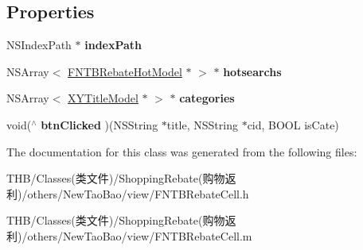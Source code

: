 \subsection*{Properties}
\begin{DoxyCompactItemize}
\item 
\mbox{\label{interface_f_n_t_b_rebate_cell_a0a51dda8573fe9d5c0b9a08085ca99f9}} 
N\+S\+Index\+Path $\ast$ {\bfseries index\+Path}
\item 
\mbox{\label{interface_f_n_t_b_rebate_cell_a8d8a9a8923c93d81552ce3d4c0375447}} 
N\+S\+Array$<$ \mbox{\hyperlink{interface_f_n_t_b_rebate_hot_model}{F\+N\+T\+B\+Rebate\+Hot\+Model}} $\ast$ $>$ $\ast$ {\bfseries hotsearchs}
\item 
\mbox{\label{interface_f_n_t_b_rebate_cell_a47fb61c195da844efce52141aa17aa66}} 
N\+S\+Array$<$ \mbox{\hyperlink{interface_x_y_title_model}{X\+Y\+Title\+Model}} $\ast$ $>$ $\ast$ {\bfseries categories}
\item 
\mbox{\label{interface_f_n_t_b_rebate_cell_a5fc4c6fad152443324f6ef7855a5133e}} 
void($^\wedge$ {\bfseries btn\+Clicked} )(N\+S\+String $\ast$title, N\+S\+String $\ast$cid, B\+O\+OL is\+Cate)
\end{DoxyCompactItemize}


The documentation for this class was generated from the following files\+:\begin{DoxyCompactItemize}
\item 
T\+H\+B/\+Classes(类文件)/\+Shopping\+Rebate(购物返利)/others/\+New\+Tao\+Bao/view/F\+N\+T\+B\+Rebate\+Cell.\+h\item 
T\+H\+B/\+Classes(类文件)/\+Shopping\+Rebate(购物返利)/others/\+New\+Tao\+Bao/view/F\+N\+T\+B\+Rebate\+Cell.\+m\end{DoxyCompactItemize}
